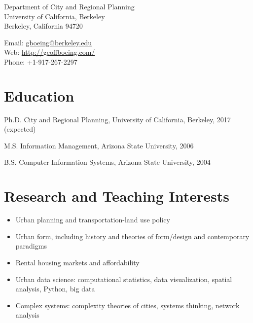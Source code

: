 \documentclass{mycv}
\begin{document}
\raggedright

\namefont{\myname}

\vspace{1em}
\begin{minipage}[t]{0.495\textwidth}
  Department of City and Regional Planning \\
  University of California, Berkeley \\
  Berkeley, California 94720
\end{minipage}
\begin{minipage}[t]{0.495\textwidth}
  Email: \href{mailto:gboeing@berkeley.edu}{gboeing@berkeley.edu} \\
  Web: \href{http://geoffboeing.com/}{http://geoffboeing.com/} \\
  Phone: +1-917-267-2297
\end{minipage}
\vspace{0.5em}



\section*{Education}

\begin{tablist}
\item[Ph.D.] \tab City and Regional Planning, University of California, Berkeley, 2017 (expected)
\item[M.S.]  \tab Information Management, Arizona State University, 2006
\item[B.S.]  \tab Computer Information Systems, Arizona State University, 2004
\end{tablist}



\section*{Research and Teaching Interests}

\begin{itemize}
\item Urban planning and transportation-land use policy
\item Urban form, including history and theories of form/design and contemporary paradigms
\item Rental housing markets and affordability
\item Urban data science: computational statistics, data visualization, spatial analysis, Python, big data
\item Complex systems: complexity theories of cities, systems thinking, network analysis
\end{itemize}
\end{document}
